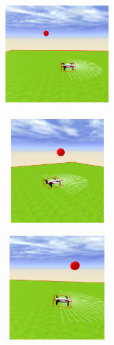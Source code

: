 \begin{figure}[H]

\begin{subfigure}[t]{0.2\textwidth}
  \includegraphics[width=4cm, height=4cm]{img/followBallTello2.png}
\label{fig:figure2_2}
\end{subfigure}\hfill
\begin{subfigure}[t]{0.2\textwidth}
    \includegraphics[width=4cm, height=4cm]{img/followBallTello3.png}
\label{fig:figure2_3}
\end{subfigure}\hfill
\begin{subfigure}[t]{0.2\textwidth}
    \includegraphics[width=4cm, height=4cm]{img/followBallTello4.png}
\label{fig:figure2_4}
\end{subfigure}


\end{figure}

